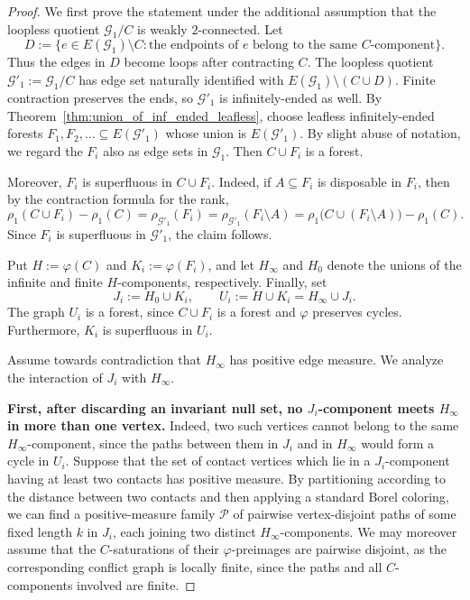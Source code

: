 \documentclass{article}
\theoremstyle{plain}
\theoremstyle{definition}
\newcommand{\cG}{\mathcal{G}}
\begin{document}
\begin{proof}
We first prove the statement under the additional assumption that the loopless quotient $\cG_1/C$ is weakly $2$-connected. Let
\[
    D:=\{e\in E(\cG_1)\setminus C:
    \text{the endpoints of $e$ belong to the same $C$-component}\}.
\]
Thus the edges in $D$ become loops after contracting $C$. The loopless quotient $\cG'_1:=\cG_1/C$ has edge set naturally identified with $E(\cG_1)\setminus(C\cup D)$. Finite contraction preserves the ends, so $\cG'_1$ is infinitely-ended as well. By Theorem~\ref{thm:union_of_inf_ended_leafless}, choose leafless infinitely-ended forests $F_1,F_2,\ldots\subseteq E(\cG'_1)$
whose union is $E(\cG'_1)$. By slight abuse of notation, we regard the $F_i$ also as edge sets in $\cG_1$. Then $C\cup F_i$ is a forest.

Moreover, $F_i$ is superfluous in $C\cup F_i$. Indeed, if $A\subseteq F_i$ is disposable in $F_i$, then by the contraction formula for the rank,
\[
    \rho_1(C\cup F_i)-\rho_1(C) = \rho_{\cG'_1}(F_i) = \rho_{\cG'_1}(F_i\setminus A) = \rho_1\bigl(C\cup(F_i\setminus A)\bigr)-\rho_1(C).
\]
Since $F_i$ is superfluous in $\cG'_1$, the claim follows.

Put $H:=\varphi(C)$ and $K_i:=\varphi(F_i)$, and let $H_\infty$ and $H_0$ denote the unions of the infinite and finite $H$-components, respectively. Finally, set
\[
    J_i:=H_0\cup K_i,\qquad
    U_i:=H\cup K_i=H_\infty\cup J_i.
\]
The graph $U_i$ is a forest, since $C\cup F_i$ is a forest and $\varphi$ preserves cycles. Furthermore, $K_i$ is superfluous in $U_i$.

Assume towards contradiction that $H_\infty$ has positive edge measure. We analyze the interaction of $J_i$ with $H_\infty$.

{\bf First, after discarding an invariant null set, no $J_i$-component meets $H_\infty$ in more than one vertex.} Indeed, two such vertices cannot belong to the same $H_\infty$-component, since the paths between them in $J_i$ and in $H_\infty$ would form a cycle in $U_i$. Suppose that the set of contact vertices which lie in a $J_i$-component having at least two contacts has positive measure. By partitioning according to the distance between two contacts and then applying a standard Borel coloring, we can find a positive-measure family $\mathscr P$ of pairwise vertex-disjoint paths of some fixed length $k$ in $J_i$, each joining two distinct $H_\infty$-components. We may moreover assume that the $C$-saturations of their $\varphi$-preimages are pairwise disjoint, as the corresponding conflict graph is locally finite, since the paths and all $C$-components involved are finite.


\end{proof}
\end{document}
